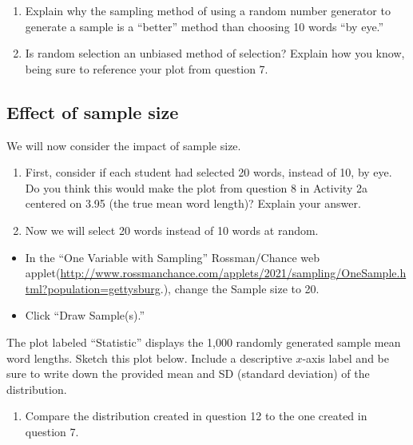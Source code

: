 \documentclass[
]{report}
\providecommand{\tightlist}{%
  \setlength{\itemsep}{0pt}\setlength{\parskip}{0pt}}
\begin{document}
\newpage

\begin{enumerate}
\def\labelenumi{\arabic{enumi}.}
\setcounter{enumi}{8}
\item
  Explain why the sampling method of using a random number generator to generate a sample is a ``better'' method than choosing 10 words ``by eye.''
  \vspace{0.8in}
\item
  Is random selection an unbiased method of selection? Explain how you know, being sure to reference your plot from question 7.
  \vspace{0.5in}
\end{enumerate}

\hypertarget{effect-of-sample-size}{%
\subsection*{Effect of sample size}\label{effect-of-sample-size}}

We will now consider the impact of sample size.

\begin{enumerate}
\def\labelenumi{\arabic{enumi}.}
\setcounter{enumi}{10}
\item
  First, consider if each student had selected 20 words, instead of 10, by eye. Do you think this would make the plot from question 8 in Activity 2a centered on 3.95 (the true mean word length)? Explain your answer.
\item
  Now we will select 20 words instead of 10 words at random.
\end{enumerate}

\begin{itemize}
\item
  In the ``One Variable with Sampling'' Rossman/Chance web applet(\url{http://www.rossmanchance.com/applets/2021/sampling/OneSample.html?population=gettysburg}.), change the Sample size to 20.
\item
  Click ``Draw Sample(s).''
\end{itemize}

The plot labeled ``Statistic'' displays the 1,000 randomly generated sample mean word lengths. Sketch this plot below. Include a descriptive \(x\)-axis label and be sure to write down the provided mean and SD (standard deviation) of the distribution.
\vspace{1.7in}

\begin{enumerate}
\def\labelenumi{\arabic{enumi}.}
\setcounter{enumi}{12}
\tightlist
\item
  Compare the distribution created in question 12 to the one created in question 7.
\end{enumerate}
\end{document}

